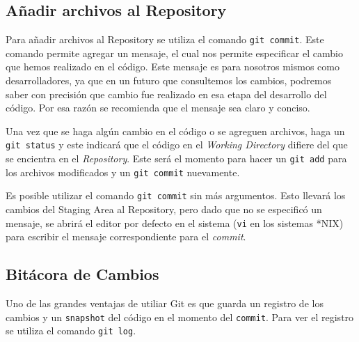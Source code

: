 \subsection{Añadir archivos al Repository}

Para añadir archivos al Repository se utiliza el comando
\texttt{git\ commit}. Este comando permite agregar un mensaje, el cual
nos permite especificar el cambio que hemos realizado en el código. Este
mensaje es para nosotros mismos como desarrolladores, ya que en un
futuro que consultemos los cambios, podremos saber con precisión que
cambio fue realizado en esa etapa del desarrollo del código. Por esa
razón se recomienda que el mensaje sea claro y conciso.

\begin{Shaded}
\begin{Highlighting}[]
    \ExtensionTok{$} 
\end{Highlighting}
\end{Shaded}

Una vez que se haga algún cambio en el código o se agreguen archivos,
haga un \texttt{git\ status} y este indicará que el código en el
\emph{Working Directory} difiere del que se encientra en el
\emph{Repository}. Este será el momento para hacer un \texttt{git\ add}
para los archivos modificados y un \texttt{git\ commit} nuevamente.

Es posible utilizar el comando \texttt{git\ commit} sin más argumentos.
Esto llevará los cambios del Staging Area al Repository, pero dado que
no se especificó un mensaje, se abrirá el editor por defecto en el
sistema (\texttt{vi} en los sistemas *NIX) para escribir el mensaje
correspondiente para el \emph{commit}.

\subsection{Bitácora de Cambios}

Uno de las grandes ventajas de utiliar Git es que guarda un registro de
los cambios y un \texttt{snapshot} del código en el momento del
\texttt{commit}. Para ver el registro se utiliza el comando
\texttt{git\ log}.

\begin{Shaded}
\begin{Highlighting}[]
    \ExtensionTok{$}
\end{Highlighting}
\end{Shaded}

